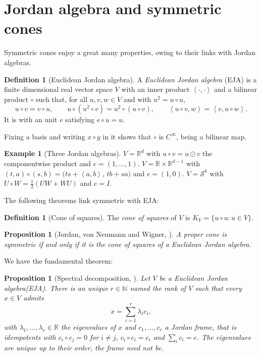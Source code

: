 \documentclass[a4paper,11pt]{book}
\theoremstyle{plain}
\newtheorem{proposition}[theorem]{Proposition}
\theoremstyle{definition}
\newtheorem{definition}[theorem]{Definition}
\newtheorem{example}[theorem]{Example}
\theoremstyle{remark}
\numberwithin{equation}{chapter}
\numberwithin{algorithm}{chapter}
\newcommand{\R}{\mathbb{R}}
\newcommand{\Sp}{\mathcal{S}}
\newcommand{\inner}[2]{\left\langle #1, #2 \right\rangle}
\begin{document}
	\section{Jordan algebra and symmetric cones}
	
	Symmetric cones enjoy a great many properties, owing to their links with
	Jordan algebras.
	\begin{definition}[Euclidean Jordan algebra]
		A \emph{Euclidean Jordan algebra} (EJA) is a finite dimensional real vector space $V$
		with an inner product $\inner{\cdot}{\cdot}$ and a bilinear product $\circ$
		such that, for all $u,v,w\in V$ and with $u^2=u\circ u$,
		\begin{equation}
			u\circ v=v\circ u,
			\qquad
			u\circ(u^2\circ v)=u^2\circ(u\circ v),
			\qquad
			\inner{u\circ v}{w}=\inner{v}{u\circ w} .
		\end{equation}
		It is with an unit $e$ satisfying $e\circ u=u$.
	\end{definition}
	
	Fixing a basis and writing $x\circ y$ in it shows that $\circ$ is $C^{\infty}$,
	being a bilinear map.
	
	\begin{example}[Three Jordan algebras]
		$V=\R^d$ with $u\circ v=u\odot v$ the componentwise product and $e=(1,\dots,1)$.
		$V=\R\times\R^{d-1}$ with
		$(t,a)\circ(s,b)=\bigl(ts+\inner{a}{b},\,tb+sa\bigr)$ and $e=(1,0)$.
		$V=\Sp^k$ with $U\circ W=\tfrac12(UW+WU)$ and $e=I$.
	\end{example}
	
	The following theorems link symmetric with EJA:
	\begin{definition}[Cone of squares]
		The \emph{cone of squares} of $V$ is $K_V=\{u\circ u:u\in V\}$.
	\end{definition}
	
	\begin{proposition}[Jordan, von Neumann and Wigner, \cite{FarautKoranyi1994}]
		A proper cone is symmetric if and only if it is the cone of squares of a
		Euclidean Jordan algebra.
	\end{proposition}
	
	We have the fundamental theorem:
	
	\begin{proposition}[Spectral decomposition, \cite{FarautKoranyi1994}]
		Let $V$ be a Euclidean Jordan algebra(EJA). There is an unique $r\in \mathbb{N}$ named the rank of $V$ such that every $x\in V$ admits
		\begin{equation}
			x=\sum_{i=1}^{r}\lambda_i c_i ,
		\end{equation}
		with $\lambda_1,\dots,\lambda_r\in\R$ the \emph{eigenvalues} of $x$ and
		$c_1,\dots,c_r$ a Jordan frame, that is idempotents with $c_i\circ c_j=0$ for
		$i\neq j$, $c_i\circ c_i=c_i$ and $\sum_ic_i=e$. The eigenvalues are unique up
		to their order, the frame need not be. 
	\end{proposition}
	
\end{document}
